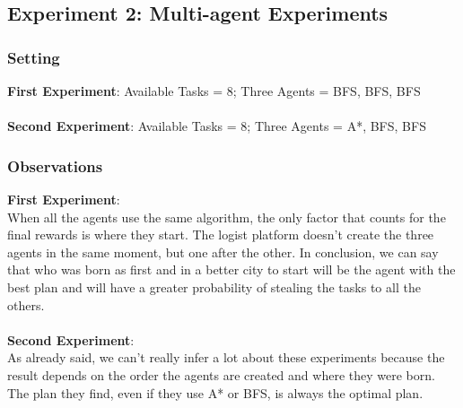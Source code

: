 \documentclass[11pt]{article}
\begin{document}
\subsection{Experiment 2: Multi-agent Experiments}

\subsubsection{Setting}

\textbf{First Experiment}: Available Tasks = 8; Three Agents = BFS, BFS, BFS
\\
\\
\textbf{Second Experiment}: Available Tasks = 8; Three Agents = A*, BFS, BFS
\subsubsection{Observations}
\textbf{First Experiment}:\\
When all the agents use the same algorithm, the only factor that counts for the final rewards is where they start. The logist platform doesn't create the three agents in the same moment, but one after the other. In conclusion, we can say that who was born as first and in a better city to start will be the agent with the best plan and will have a greater probability of stealing the tasks to all the others.\\
\\
\textbf{Second Experiment}:\\
As already said, we can't really infer a lot about these experiments because the result depends on the order the agents are created and where they were born. The plan they find, even if they use A* or BFS, is always the optimal plan.
\end{document}
